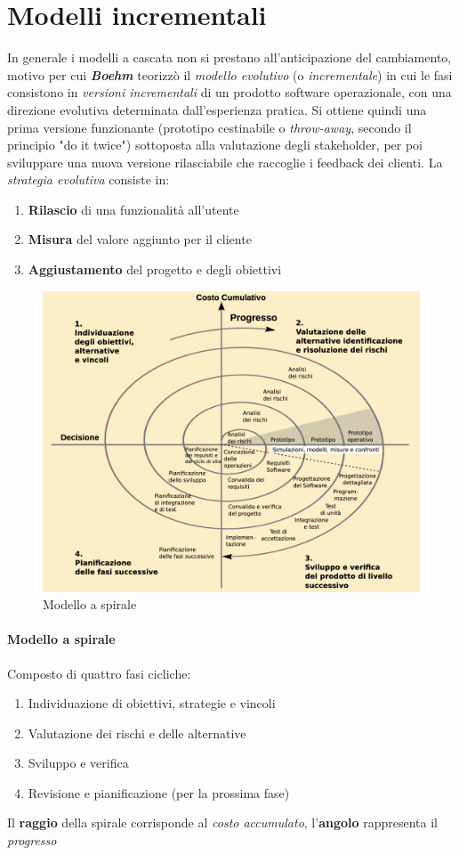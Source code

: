 \newpage

\section{Modelli incrementali}

In generale i modelli a cascata non si prestano all'anticipazione del cambiamento, motivo per cui \textbf{\textit{Boehm}} teorizzò il \textit{modello evolutivo} (o \textit{incrementale}) in cui le fasi consistono in \textit{versioni incrementali} di un prodotto software operazionale, con una direzione evolutiva determinata dall'esperienza pratica. Si ottiene quindi una prima versione funzionante (prototipo cestinabile o \textit{throw-away}, secondo il principio "do it twice") sottoposta alla valutazione degli stakeholder, per poi sviluppare una nuova versione rilasciabile che raccoglie i feedback dei clienti. La \textit{strategia evolutiva} consiste in:
\begin{enumerate}
    \item \textbf{Rilascio} di una funzionalità all'utente
    \item \textbf{Misura} del valore aggiunto per il cliente
    \item \textbf{Aggiustamento} del progetto e degli obiettivi
\end{enumerate}

\begin{figure}[H]
    \centering
    \includegraphics[width=0.75\linewidth]{assets/spirale.png}
    \caption{Modello a spirale}
    \label{fig:modello-spirale}
\end{figure}

\paragraph{Modello a spirale} Composto di quattro fasi cicliche:
\begin{enumerate}
    \item Individuazione di obiettivi, strategie e vincoli
    \item Valutazione dei rischi e delle alternative
    \item Sviluppo e verifica
    \item Revisione e pianificazione (per la prossima fase)
\end{enumerate}
Il \textbf{raggio} della spirale corrisponde al \textit{costo accumulato}, l'\textbf{angolo} rappresenta il \textit{progresso}

